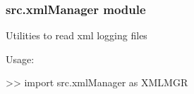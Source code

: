 \documentclass[a4paper,10pt,english]{sphinxmanual}
\begin{document}

\begin{fulllineitems}
\label{\detokenize{apidoc_src/src:src.utilsSat.warning}}
\end{fulllineitems}


\begin{fulllineitems}
\label{\detokenize{apidoc_src/src:src.utilsSat.white}}
\end{fulllineitems}


\begin{fulllineitems}
\label{\detokenize{apidoc_src/src:src.utilsSat.yellow}}
\end{fulllineitems}



\subsubsection{src.xmlManager module}
\label{\detokenize{apidoc_src/src:src-xmlmanager-module}}\label{\detokenize{apidoc_src/src:module-src.xmlManager}}
Utilities to read xml logging files

\begin{DUlineblock}{0em}
\item[] Usage:
\item[] \textgreater{}\textgreater{} import src.xmlManager as XMLMGR
\end{DUlineblock}
\end{document}
